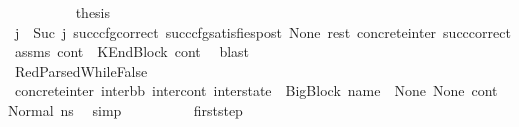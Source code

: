 \begin{isabellebody}
\isanewline
\ \ \ \ \ \ \ \ \isamarkupfalse%
\ {\isacharquery}{\kern0pt}thesis\ \isamarkupfalse%
\ {\isacartoucheopen}j\ {\isacharequal}{\kern0pt}\ Suc\ j{\isacharprime}{\kern0pt}{\isacartoucheclose}\ succ{\isacharunderscore}{\kern0pt}cfg{\isacharunderscore}{\kern0pt}correct\ succ{\isacharunderscore}{\kern0pt}cfg{\isacharunderscore}{\kern0pt}satisfies{\isacharunderscore}{\kern0pt}post\ None\ rest\ concrete{\isacharunderscore}{\kern0pt}inter{}\ succ{\isacharunderscore}{\kern0pt}correct\ assms{\isacharparenleft}{\kern0pt}{}{\isacharparenright}{\kern0pt}\ {\isacartoucheopen}cont{}\ {\isacharequal}{\kern0pt}\ KEndBlock\ cont{}{\isacartoucheclose}\ \isamarkupfalse%
\ blast\ \isanewline
\ \ \ \ \ \ \isamarkupfalse%
\ \isanewline
\ \ \ \ \ \ \ \ \isamarkupfalse%
\ RedParsedWhileFalse\isanewline
\ \ \ \ \ \ \ \ \isamarkupfalse%
\ concrete{\isacharunderscore}{\kern0pt}inter{}{\isacharcolon}{\kern0pt}\ {\isachardoublequoteopen}{\isacharparenleft}{\kern0pt}inter{\isacharunderscore}{\kern0pt}bb{\isacharcomma}{\kern0pt}\ inter{\isacharunderscore}{\kern0pt}cont{\isacharcomma}{\kern0pt}\ inter{\isacharunderscore}{\kern0pt}state{\isacharparenright}{\kern0pt}\ {\isacharequal}{\kern0pt}\ {\isacharparenleft}{\kern0pt}{\isacharparenleft}{\kern0pt}BigBlock\ name\ {\isacharbrackleft}{\kern0pt}{\isacharbrackright}{\kern0pt}\ None\ None{\isacharparenright}{\kern0pt}{\isacharcomma}{\kern0pt}\ cont{}{\isacharcomma}{\kern0pt}\ {\isacharparenleft}{\kern0pt}Normal\ ns{}{\isacharparenright}{\kern0pt}{\isacharparenright}{\kern0pt}{\isachardoublequoteclose}\ \isamarkupfalse%
\ simp\isanewline
\isanewline
\ \ \ \ \ \ \ \ \isamarkupfalse%
\ first{\isacharunderscore}{\kern0pt}step\isanewline
\ \ \ \ \ \ \ \ \isamarkupfalse%

\end{isabellebody}
